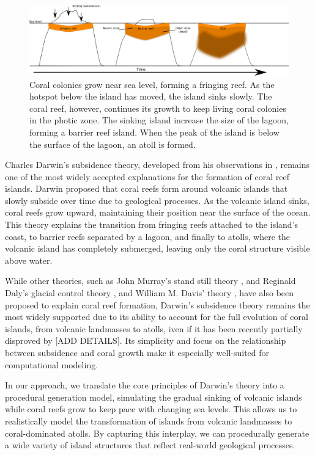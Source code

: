 \begin{figure}[ht]
    \centering
    \includegraphics[width = \linewidth]{reefGrowth.pdf}
    \caption{Coral colonies grow near sea level, forming a fringing reef. As the hotspot below the island has moved, the island sinks slowly. The coral reef, however, continues its growth to keep living coral colonies in the photic zone. The sinking island increase the size of the lagoon, forming a barrier reef island. When the peak of the island is below the surface of the lagoon, an atoll is formed. }
    \label{fig:coral-island_reef-growth}
\end{figure}
% 
Charles Darwin's subsidence theory, developed from his observations in \citep{Darwin1842}, remains one of the most widely accepted explanations for the formation of coral reef islands. Darwin proposed that coral reefs form around volcanic islands that slowly subside over time due to geological processes. As the volcanic island sinks, coral reefs grow upward, maintaining their position near the surface of the ocean. This theory explains the transition from fringing reefs attached to the island's coast, to barrier reefs separated by a lagoon, and finally to atolls, where the volcanic island has completely submerged, leaving only the coral structure visible above water.

While other theories, such as John Murray's stand still theory \cite{Murray1880}, and Reginald Daly's glacial control theory \cite{Daly1915}, and William M. Davis' theory \cite{Davis1928}, have also been proposed to explain coral reef formation, Darwin's subsidence theory remains the most widely supported due to its ability to account for the full evolution of coral islands, from volcanic landmasses to atolls, iven if it has been recently partially disproved by \citep{Droxler2021} [ADD DETAILS]. Its simplicity and focus on the relationship between subsidence and coral growth make it especially well-suited for computational modeling.

In our approach, we translate the core principles of Darwin's theory into a procedural generation model, simulating the gradual sinking of volcanic islands while coral reefs grow to keep pace with changing sea levels. This allows us to realistically model the transformation of islands from volcanic landmasses to coral-dominated atolls. By capturing this interplay, we can procedurally generate a wide variety of island structures that reflect real-world geological processes.


